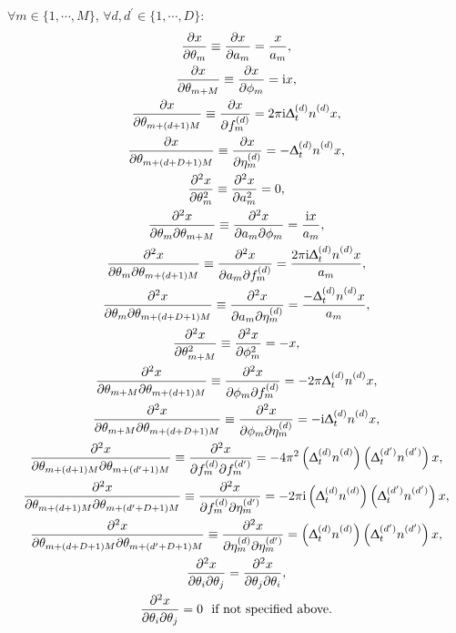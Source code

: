 $\forall m \in \lbrace 1, \cdots, M \rbrace$,
$\forall d, d^{\prime} \in \lbrace 1, \cdots, D \rbrace$:
\begin{subequations}
    \begin{gather}
        \xderiv{\theta_m} \equiv
            \xderiv{a_m} =
            \frac{x}{a_m},\\
        \xderiv{\theta_{m + M}} \equiv
            \xderiv{\phi_m} =
            \iu x,\\
        \xderiv{\theta_{m + (d + 1)M}} \equiv
            \xderiv{\fdm} =
            2 \pi \iu \Dtd \nd x,\\
        \xderiv{\theta_{m + (d + D + 1)M}} \equiv
            \xderiv{\etadm} =
            - \Dtd \nd x,\\
        \xderivtwosame{\theta_{m}} \equiv
            \xderivtwosame{a_m} =
            0,
            \label{eq:amp-second-deriv}\\
        \xderivtwodiff{\theta_{m}}{\theta_{m + M}} \equiv
            \xderivtwodiff{a_m}{\phi_m} =
            \frac{\iu x}{a_m},\\
        \xderivtwodiff{\theta_{m}}{\theta_{m + (d + 1)M}} \equiv
            \xderivtwodiff{a_m^{\vphantom{(d)}}}{\fdm} =
            \frac{2 \pi \iu \Dtd \nd x}{a_m},\\
        \xderivtwodiff{\theta_{m}}{\theta_{m + (d + D + 1)M}} \equiv
            \xderivtwodiff{a_m^{\vphantom{(d)}}}{\etadm} =
            \frac{-\Dtd \nd x}{a_m},\\
        \xderivtwosame{\theta_{m + M}} \equiv
            \xderivtwosame{\phi_m} =
            -x,\\
        \xderivtwodiff{\theta_{m + M}}{\theta_{m + (d + 1)M}} \equiv
            \xderivtwodiff{\phi_m^{\vphantom{(d)}}}{\fdm} =
            -2 \pi \Dtd \nd x,\\
        \xderivtwodiff{\theta_{m + M}}{\theta_{m + (d + D + 1)M}} \equiv
            \xderivtwodiff{\phi_m^{\vphantom{(d)}}}{\etadm} =
            -\iu \Dtd \nd x,\\
        \xderivtwodiff{\theta_{m + (d + 1)M}}{\theta_{m + (d^{\prime} + 1)M}} \equiv
            \xderivtwodiff{\fdm}{\fdmp} =
            -4\pi^2 \left(\Dtd \nd \right) \left(\Dtdp \ndp \right) x,\\
        \xderivtwodiff{\theta_{m + (d + 1)M}}{\theta_{m + (d^{\prime} + D + 1)M}} \equiv
            \xderivtwodiff{\fdm}{\etadmp} =
            -2 \pi \iu \left(\Dtd \nd \right) \left(\Dtdp \ndp \right) x,\\
        \xderivtwodiff{\theta_{m + (d + D + 1)M}}{\theta_{m + (d^{\prime} + D + 1)M}} \equiv
            \xderivtwodiff{\etadm}{\etadmp} =
            \left(\Dtd \nd \right) \left(\Dtdp \ndp \right) x,\\
        \xderivtwodiff{\theta_{i}}{\theta_{j}} =
            \xderivtwodiff{\theta_{j}}{\theta_{i}},
            \label{eq:symmetric-second-derivs}\\
        \xderivtwodiff{\theta_{i}}{\theta_{j}} = 0\ \text{ if not specified above.}
        \label{eq:zero-second-deriv}
    \end{gather}
\end{subequations}
